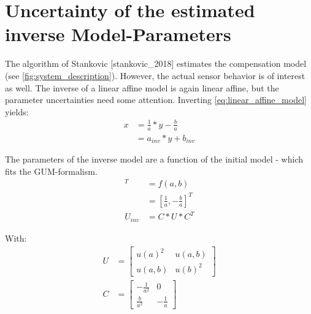 \documentclass[10pt,a4paper,onecolumn]{article}
\begin{document}
    \section{Uncertainty of the estimated inverse Model-Parameters}
    The algorithm of Stankovic [stankovic\_2018] estimates the compensation model (see \cref{fig:system_description}). However, the actual sensor behavior is of interest as well. The inverse of a linear affine model is again linear affine, but the parameter uncertainties need some attention. Inverting \cref{eq:linear_affine_model} yields:
    \begin{align}
        x &= \frac{1}{a} * y - \frac{b}{a} \\
        &= a_{inv} * y + b_{inv}
    \end{align}
    
    The parameters of the inverse model are a function of the initial model - which fits the GUM-formalism. 
    \begin{align}
        [a_{inv}, b_{inv}]^T &= f(a, b) \\
        &= [\frac{1}{a}, -\frac{b}{a}]^T \\
        U_{inv} &= C * U * C^T
    \end{align}
    
    With:
    \begin{align}
        U &=  
        \begin{bmatrix}
            u(a)^2 & u(a, b) \\
            u(a, b) & u(b)^2 
        \end{bmatrix} \\
        C &=
        \begin{bmatrix}
            -\frac{1}{a^2} & 0 \\
            \frac{b}{a^2} & -\frac{1}{a}
        \end{bmatrix}
    \end{align}
\end{document}
